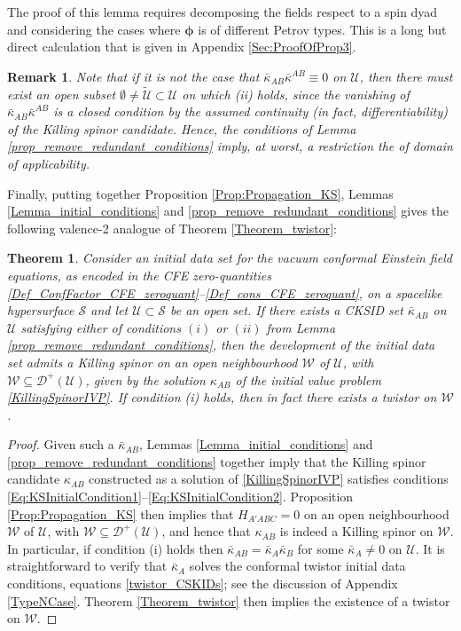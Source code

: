 \documentclass[10pt,a4paper]{article}
\theoremstyle{plain}
\newtheorem{theorem}{Theorem}
\newtheorem{remark}{Remark}
\begin{document}
The proof of this lemma requires decomposing the fields respect to a spin dyad
and considering the cases where $\bm\phi$ is of different Petrov types.
This is a long but direct calculation that is given in Appendix \ref{Sec:ProofOfProp3}.
\begin{remark}{\em 
Note that if it is not the case that $\bar{\kappa}_{AB}\bar{\kappa}^{AB}\equiv 0$ on
$\mathcal{U}$, then there must exist an open subset
$\emptyset\neq \tilde{\mathcal{U}}\subset\mathcal{U}$ on which
(ii) holds, since the vanishing of
$\bar{\kappa}_{AB}\bar{\kappa}^{AB}$ is a closed condition by the assumed
continuity (in fact, differentiability) of the Killing spinor
candidate. Hence, the conditions of Lemma \eqref{prop_remove_redundant_conditions} imply, at worst, a restriction the of domain of applicability.}
\end{remark}

\noindent
Finally, putting together Proposition \ref{Prop:Propagation_KS},
Lemmas \ref{Lemma_initial_conditions} and
\ref{prop_remove_redundant_conditions} gives the following valence-2
analogue of Theorem \ref{Theorem_twistor}:

\begin{theorem}\label{Theorem_KS}
Consider an initial data set for the vacuum conformal Einstein field
equations, as encoded in the CFE zero-quantities
\eqref{Def_ConfFactor_CFE_zeroquant}--\eqref{Def_cons_CFE_zeroquant},
on a spacelike hypersurface $\mathcal{S}$ and let
$\mathcal{U}\subset\mathcal{S}$ be an open set.  If there exists a
CKSID set $\bar{\kappa}_{AB}$ on $\mathcal{U}$ satisfying either of
conditions $(i)$ or $(ii)$ from Lemma
\ref{prop_remove_redundant_conditions}, then the development of the
initial data set admits a Killing spinor on an open neighbourhood 
$\mathcal{W}$ of $\mathcal{U}$, with $\mathcal{W}\subseteq\mathcal{D}^+(\mathcal{U})$,
given by the solution $\kappa_{AB}$ of
the initial value problem \eqref{KillingSpinorIVP}. If condition (i) holds, then in fact
there exists a twistor on $\mathcal{W}$.
\end{theorem}

\begin{proof}

Given such a $\bar{\kappa}_{AB}$, Lemmas
\ref{Lemma_initial_conditions} and
\ref{prop_remove_redundant_conditions} together imply that the Killing
spinor candidate $\kappa_{AB}$ constructed as a solution of
\eqref{KillingSpinorIVP} satisfies conditions
\eqref{Eq:KSInitialCondition1}--\eqref{Eq:KSInitialCondition2}. Proposition
\ref{Prop:Propagation_KS} then implies that $H_{A'ABC}=0$ on
an open neighbourhood $\mathcal{W}$ of $\mathcal{U}$, with
$\mathcal{W} \subseteq \mathcal{D}^+(\mathcal{U})$,
and hence that $\kappa_{AB}$ is indeed a
Killing spinor on $\mathcal{W}$. In particular, if condition (i) holds then
$\bar{\kappa}_{AB}=\bar{\kappa}_A\bar{\kappa}_B$ for some
$\bar{\kappa}_A\neq 0$ on $\mathcal{U}$. It is straightforward to
verify that $\bar{\kappa}_A$ solves the conformal twistor initial data
conditions, equations \eqref{twistor_CSKIDs}; see the discussion of
Appendix \ref{TypeNCase}. Theorem \ref{Theorem_twistor} then implies
the existence of a twistor on $\mathcal{W}$.
\end{proof}
\end{document}
